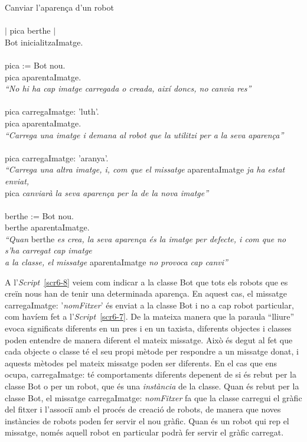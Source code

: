 \begin{script}  Canviar l'aparença d'un robot
\noindent
\textsf{\upshape
\\
\\$|$ pica berthe $|$\\
Bot inicialitzaImatge.\\
\\
pica := Bot nou.\\
pica aparentaImatge.\\
{\itshape ``No hi ha cap imatge carregada o creada, així doncs, no canvia res''}\\
\\
pica carregaImatge: 'luth'.\\
pica aparentaImatge.\\
{\itshape ``Carrega una imatge i demana al robot que la utilitzi per a la seva aparença''}\\
\\
pica carregaImatge: 'aranya'.\\
{\itshape ``Carrega una altra imatge, i, com que el missatge} aparentaImatge {\itshape ja ha estat enviat,} \\
pica {\itshape canviarà la seva aparença per la de la nova imatge''}\\
\\
berthe := Bot nou.\\
berthe aparentaImatge.\\
{\itshape ``Quan} berthe {\itshape es crea, la seva aparença és la imatge per defecte, i com que no s'ha carregat cap imatge} \\
{\itshape a la classe, el missatge} aparentaImatge {\itshape no provoca cap canvi''}
}
\label{scr6-7}
\end{script}

A l'\emph{Script}~\ref{scr6-8} veiem com indicar a la classe \textsf{Bot} que tots els robots que es creïn nous han de tenir una determinada aparença. En aquest cas, el missatge \textsf{carregaImatge: '{\itshape nomFitxer}'} és enviat a la classe \textsf{Bot} i no a cap robot particular, com havíem fet a l'\emph{Script}~\ref{scr6-7}. De la mateixa manera que la paraula ``lliure'' evoca significats diferents en un pres i en un taxista, diferents objectes i classes poden entendre de manera diferent el mateix missatge. Això és degut al fet que cada objecte o classe té el seu propi mètode per respondre a un missatge donat, i aquests mètodes pel mateix missatge poden ser diferents. En el cas que ens ocupa, \textsf{carregaImatge:} té comportaments diferents depenent de si és rebut per la classe \textsf{Bot} o per un robot, que és una \emph{instància} de la classe. Quan és rebut per la classe \textsf{Bot}, el missatge \textsf{carregaImatge: {\itshape nomFitxer}} fa que la classe carregui el gràfic del fitxer i l'associï amb el procés de creació de robots, de manera que noves instàncies de robots poden fer servir el nou gràfic. Quan és un robot qui rep el missatge, només aquell robot en particular podrà fer servir el gràfic carregat.

